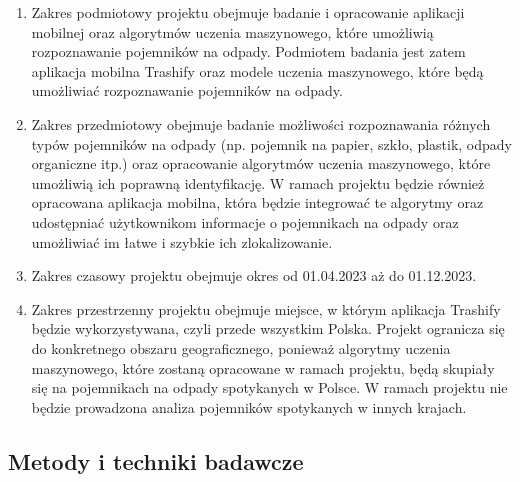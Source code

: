 \documentclass[12pt,oneside]{book}
\begin{document}
\begin{enumerate}[label=--]
    \item Zakres podmiotowy projektu \topic  obejmuje badanie i opracowanie aplikacji mobilnej oraz algorytmów uczenia maszynowego, które umożliwią rozpoznawanie pojemników na odpady. Podmiotem badania jest zatem aplikacja mobilna Trashify oraz modele uczenia maszynowego, które będą umożliwiać rozpoznawanie pojemników na odpady.
    \item Zakres przedmiotowy obejmuje badanie możliwości rozpoznawania różnych typów pojemników na odpady (np. pojemnik na papier, szkło, plastik, odpady organiczne itp.) oraz opracowanie algorytmów uczenia maszynowego, które umożliwią ich poprawną identyfikację. W ramach projektu będzie również opracowana aplikacja mobilna, która będzie integrować te algorytmy oraz udostępniać użytkownikom informacje o pojemnikach na odpady oraz umożliwiać im łatwe i szybkie ich zlokalizowanie.
    \item Zakres czasowy projektu obejmuje okres od 01.04.2023 aż do 01.12.2023.
    \item Zakres przestrzenny projektu obejmuje miejsce, w którym aplikacja Trashify będzie wykorzystywana, czyli przede wszystkim Polska. Projekt ogranicza się do konkretnego obszaru geograficznego, ponieważ algorytmy uczenia maszynowego, które zostaną opracowane w ramach projektu, będą skupiały się na pojemnikach na odpady spotykanych w Polsce. W ramach projektu nie będzie prowadzona analiza pojemników spotykanych w innych krajach.
\end{enumerate}

\subsection{Metody i techniki badawcze}
\end{document}
